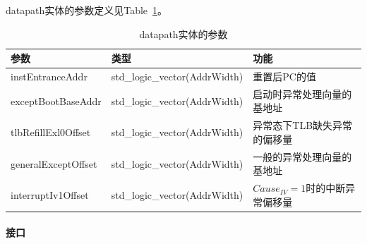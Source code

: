 \documentclass{article}
\begin{document}
\begin{spacing}{1.4}
datapath实体的参数定义见Table~\ref{tb:datapath-parameter}。
\begin{table}[!htb]
\begin{center}
\begin{tabular*}{15cm}{l|l|l}
\hline
\textbf{参数}&\textbf{类型}&\textbf{功能} \\
\hline instEntranceAddr        & std\_logic\_vector(AddrWidth)    & 重置后PC的值 \\
\hline exceptBootBaseAddr      & std\_logic\_vector(AddrWidth)    & 启动时异常处理向量的基地址 \\
\hline tlbRefillExl0Offset     & std\_logic\_vector(AddrWidth)    & 异常态下TLB缺失异常的偏移量 \\
\hline generalExceptOffset     & std\_logic\_vector(AddrWidth)    & 一般的异常处理向量的基地址 \\
\hline interruptIv1Offset      & std\_logic\_vector(AddrWidth)    & $Cause_{IV}=1$时的中断异常偏移量 \\
\hline
\end{tabular*}
\caption{datapath实体的参数}
\label{tb:datapath-parameter}
\end{center}
\end{table}

\paragraph{接口}\mbox{}


\end{spacing}
\end{document}
